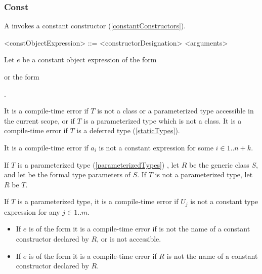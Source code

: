 \documentclass[makeidx]{article}
\begin{document}
{
\EndCase


\subsubsection{Const}

\LMHash{}%
A  invokes a constant constructor
(\ref{constantConstructors}).

\begin{grammar}
<constObjectExpression> ::= \CONST{} <constructorDesignation> <arguments>
\end{grammar}

\LMHash{}%
Let $e$ be a constant object expression of the form

\noindent
{}
or the form

\noindent
{}.

\LMHash{}%
It is a compile-time error if $T$ is not
a class or a parameterized type accessible in the current scope,
or if $T$ is a parameterized type which is not a class.
It is a compile-time error if $T$ is a deferred type
(\ref{staticTypes}).

\LMHash{}%
It is a compile-time error if $a_i$ is not a constant expression
for some $i \in 1 .. n + k$.

\LMHash{}%
If $T$ is a parameterized type (\ref{parameterizedTypes})
,
let $R$ be the generic class $S$,
and let
be the formal type parameters of $S$.
If $T$ is not a parameterized type, let $R$ be $T$.

\LMHash{}%
If $T$ is a parameterized type,
it is a compile-time error if $U_j$ is not a constant type expression for any
$j \in 1 .. m$.

\begin{itemize}
\item
  If $e$ is of the form
  it is a compile-time error if  is not the name of
  a constant constructor declared by $R$, or \id{} is not accessible.
\item
  If $e$ is of the form
  it is a compile-time error if $R$ is not the name of
  a constant constructor declared by $R$.
\end{itemize}

}
\end{document}

